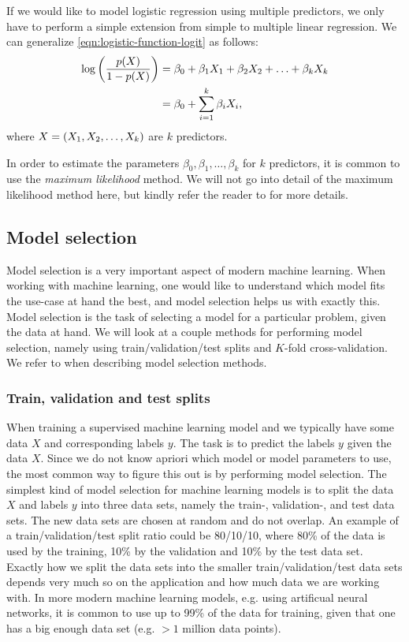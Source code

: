 If we would like to model logistic regression using multiple predictors, we only have to perform a simple extension from simple to multiple linear regression. We can generalize \cref{eqn:logistic-function-logit} as follows:
\begin{align}
    \log \left(\frac{p(X)}{1 - p(X)}\right)
    &= \beta_0 + \beta_1 X_1 + \beta_2 X_2 + \ldots + \beta_k X_k \\
    &= \beta_0 + \sum\limits_{i=1}^{k}{\beta_i X_i},
    \label{eqn:logistic-function-logit-multiple}
\end{align}
where $X = \left(X_1, X_2, \ldots, X_k\right)$ are $k$ predictors.

In order to estimate the parameters $\beta_0, \beta_1, \ldots, \beta_k$ for $k$ predictors, it is common to use the \textit{maximum likelihood} method. We will not go into detail of the maximum likelihood method here, but kindly refer the reader to \cite[p. 214]{fox2015applied} for more details.

\subsection{Model selection}
\label{sec:model-selection}
Model selection is a very important aspect of modern machine learning. When working with machine learning, one would like to understand which model fits the use-case at hand the best, and model selection helps us with exactly this. Model selection is the task of selecting a model for a particular problem, given the data at hand. We will look at a couple methods for performing model selection, namely using train/validation/test splits and $K$-fold cross-validation. We refer to \cite{James2013} when describing model selection methods.

\subsubsection{Train, validation and test splits}
\label{sec:train-val-test-splits}
When training a supervised machine learning model and  we typically have some data $X$ and corresponding labels $y$. The task is to predict the labels $y$ given the data $X$. Since we do not know apriori which model or model parameters to use, the most common way to figure this out is by performing model selection. The simplest kind of model selection for machine learning models is to split the data $X$ and labels $y$ into three data sets, namely the train-, validation-, and test data sets. The new data sets are chosen at random and do not overlap. An example of a train/validation/test split ratio could be 80/10/10, where 80\% of the data is used by the training, 10\% by the validation and 10\% by the test data set. Exactly how we split the data sets into the smaller train/validation/test data sets depends very much so on the application and how much data we are working with. In more modern machine learning models, e.g. using artificual neural networks, it is common to use up to 99\% of the data for training, given that one has a big enough data set (e.g. $>1$ million data points).

